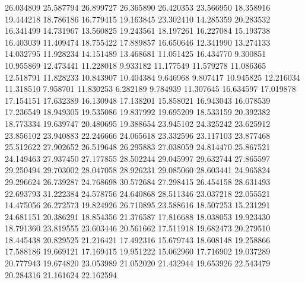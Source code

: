 26.034809
25.587794
26.899727
26.365890
26.420353
23.566950
18.358916
19.444218
18.786186
16.779415
19.163845
23.302410
14.285359
20.283532
16.341499
14.731967
13.560825
19.243561
18.197261
16.227084
15.193738
16.403039
11.409474
18.755422
17.889857
16.650646
12.341990
13.274133
14.032795
11.928234
14.151489
13.468681
11.051425
16.434770
9.300851
10.955869
12.473441
11.228018
9.933182
11.177549
11.579278
11.086365
12.518791
11.828233
10.843907
10.404384
9.646968
9.807417
10.945825
12.216034
11.318510
7.958701
11.830253
6.282189
9.784939
11.307645
16.634597
17.019878
17.154151
17.632389
16.130948
17.138201
15.858021
16.943043
16.078539
17.236549
18.949305
19.535086
19.837992
19.695209
18.533159
20.392382
18.773334
19.639747
20.480695
19.388654
23.945102
24.325242
23.625912
23.856102
23.940883
22.246666
24.065618
23.332596
23.117103
23.877468
25.512622
27.902652
26.519648
26.295883
27.038059
24.814470
25.867521
24.149463
27.937450
27.177855
28.502244
29.045997
29.632744
27.865597
29.250494
29.703002
28.047058
28.926231
29.085060
28.603441
24.965824
29.296624
26.739287
24.768698
30.572684
27.298415
26.454158
28.631493
22.693793
31.222384
24.578756
24.640868
28.511346
23.037218
22.055521
14.475056
26.272573
19.824926
26.710895
23.588616
18.507253
15.231291
24.681151
20.386291
18.854356
21.376587
17.816688
18.038053
19.923430
18.791360
23.819555
23.603446
20.561662
17.511918
19.682473
20.279510
18.445438
20.829525
21.216421
17.492316
15.679743
18.608148
19.258866
17.588186
19.669121
17.169415
19.951222
15.062960
17.716902
19.037289
20.777943
19.674820
23.053989
21.052020
21.432944
19.653926
22.543479
20.284316
21.161624
22.162594
